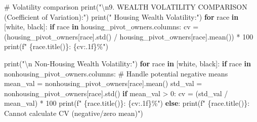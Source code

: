\documentclass[
  letterpaper,
  DIV=11,
  numbers=noendperiod]{scrartcl}
\newenvironment{Shaded}{\begin{snugshade}}{\end{snugshade}}
\newcommand{\BuiltInTok}[1]{\textcolor[rgb]{0.00,0.23,0.31}{#1}}
\newcommand{\CharTok}[1]{\textcolor[rgb]{0.13,0.47,0.30}{#1}}
\newcommand{\CommentTok}[1]{\textcolor[rgb]{0.37,0.37,0.37}{#1}}
\newcommand{\ControlFlowTok}[1]{\textcolor[rgb]{0.00,0.23,0.31}{\textbf{#1}}}
\newcommand{\DecValTok}[1]{\textcolor[rgb]{0.68,0.00,0.00}{#1}}
\newcommand{\KeywordTok}[1]{\textcolor[rgb]{0.00,0.23,0.31}{\textbf{#1}}}
\newcommand{\NormalTok}[1]{\textcolor[rgb]{0.00,0.23,0.31}{#1}}
\newcommand{\OperatorTok}[1]{\textcolor[rgb]{0.37,0.37,0.37}{#1}}
\newcommand{\SpecialCharTok}[1]{\textcolor[rgb]{0.37,0.37,0.37}{#1}}
\newcommand{\SpecialStringTok}[1]{\textcolor[rgb]{0.13,0.47,0.30}{#1}}
\newcommand{\StringTok}[1]{\textcolor[rgb]{0.13,0.47,0.30}{#1}}
\begin{document}
\begin{Shaded}
\begin{Highlighting}[]
\CommentTok{\# Volatility comparison}
\BuiltInTok{print}\NormalTok{(}\StringTok{"}\CharTok{\textbackslash{}n}\StringTok{9. WEALTH VOLATILITY COMPARISON (Coefficient of Variation):"}\NormalTok{)}
\BuiltInTok{print}\NormalTok{(}\StringTok{"   Housing Wealth Volatility:"}\NormalTok{)}
\ControlFlowTok{for}\NormalTok{ race }\KeywordTok{in}\NormalTok{ [}\StringTok{\textquotesingle{}white\textquotesingle{}}\NormalTok{, }\StringTok{\textquotesingle{}black\textquotesingle{}}\NormalTok{]:}
    \ControlFlowTok{if}\NormalTok{ race }\KeywordTok{in}\NormalTok{ housing\_pivot\_owners.columns:}
\NormalTok{        cv }\OperatorTok{=}\NormalTok{ (housing\_pivot\_owners[race].std() }\OperatorTok{/}\NormalTok{ housing\_pivot\_owners[race].mean()) }\OperatorTok{*} \DecValTok{100}
        \BuiltInTok{print}\NormalTok{(}\SpecialStringTok{f"     }\SpecialCharTok{\{}\NormalTok{race}\SpecialCharTok{.}\NormalTok{title()}\SpecialCharTok{\}}\SpecialStringTok{: }\SpecialCharTok{\{}\NormalTok{cv}\SpecialCharTok{:.1f\}}\SpecialStringTok{\%"}\NormalTok{)}

\BuiltInTok{print}\NormalTok{(}\StringTok{"}\CharTok{\textbackslash{}n}\StringTok{   Non{-}Housing Wealth Volatility:"}\NormalTok{)}
\ControlFlowTok{for}\NormalTok{ race }\KeywordTok{in}\NormalTok{ [}\StringTok{\textquotesingle{}white\textquotesingle{}}\NormalTok{, }\StringTok{\textquotesingle{}black\textquotesingle{}}\NormalTok{]:}
    \ControlFlowTok{if}\NormalTok{ race }\KeywordTok{in}\NormalTok{ nonhousing\_pivot\_owners.columns:}
        \CommentTok{\# Handle potential negative means}
\NormalTok{        mean\_val }\OperatorTok{=}\NormalTok{ nonhousing\_pivot\_owners[race].mean()}
\NormalTok{        std\_val }\OperatorTok{=}\NormalTok{ nonhousing\_pivot\_owners[race].std()}
        \ControlFlowTok{if}\NormalTok{ mean\_val }\OperatorTok{\textgreater{}} \DecValTok{0}\NormalTok{:}
\NormalTok{            cv }\OperatorTok{=}\NormalTok{ (std\_val }\OperatorTok{/}\NormalTok{ mean\_val) }\OperatorTok{*} \DecValTok{100}
            \BuiltInTok{print}\NormalTok{(}\SpecialStringTok{f"     }\SpecialCharTok{\{}\NormalTok{race}\SpecialCharTok{.}\NormalTok{title()}\SpecialCharTok{\}}\SpecialStringTok{: }\SpecialCharTok{\{}\NormalTok{cv}\SpecialCharTok{:.1f\}}\SpecialStringTok{\%"}\NormalTok{)}
        \ControlFlowTok{else}\NormalTok{:}
            \BuiltInTok{print}\NormalTok{(}\SpecialStringTok{f"     }\SpecialCharTok{\{}\NormalTok{race}\SpecialCharTok{.}\NormalTok{title()}\SpecialCharTok{\}}\SpecialStringTok{: Cannot calculate CV (negative/zero mean)"}\NormalTok{)}


\end{Highlighting}
\end{Shaded}
\end{document}
